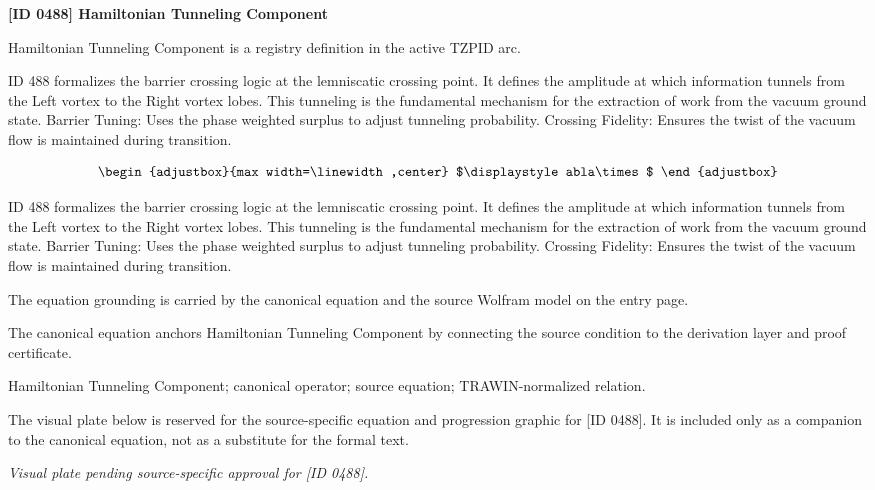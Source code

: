 \clearpage
\noindent\textbf{[ID 0488] Hamiltonian Tunneling Component}\par
\vspace{0.35em}
\begingroup\small
{}
Hamiltonian Tunneling Component is a registry definition in the active TZPID arc.

ID 488 formalizes the barrier crossing logic at the lemniscatic crossing point. It defines the amplitude at which information tunnels from the Left vortex to the Right vortex lobes. This tunneling is the fundamental mechanism for the extraction of work from the vacuum ground state. Barrier Tuning: Uses the phase weighted surplus to adjust tunneling probability. Crossing Fidelity: Ensures the twist of the vacuum flow is maintained during transition.

\[
\begin{adjustbox}{max width=\linewidth,center}
$\displaystyle
abla\times
$
\end{adjustbox}
\]

ID 488 formalizes the barrier crossing logic at the lemniscatic crossing point. It defines the amplitude at which information tunnels from the Left vortex to the Right vortex lobes. This tunneling is the fundamental mechanism for the extraction of work from the vacuum ground state. Barrier Tuning: Uses the phase weighted surplus to adjust tunneling probability. Crossing Fidelity: Ensures the twist of the vacuum flow is maintained during transition.

The equation grounding is carried by the canonical equation and the source Wolfram model on the entry page.

The canonical equation anchors Hamiltonian Tunneling Component by connecting the source condition to the derivation layer and proof certificate.

Hamiltonian Tunneling Component; canonical operator; source equation; TRAWIN-normalized relation.
\endgroup

\begingroup\footnotesize\sloppy
The visual plate below is reserved for the source-specific equation and progression graphic for [ID 0488]. It is included only as a companion to the canonical equation, not as a substitute for the formal text.
\par\endgroup
\begingroup\footnotesize\itshape
Visual plate pending source-specific approval for [ID 0488].
\par\endgroup

